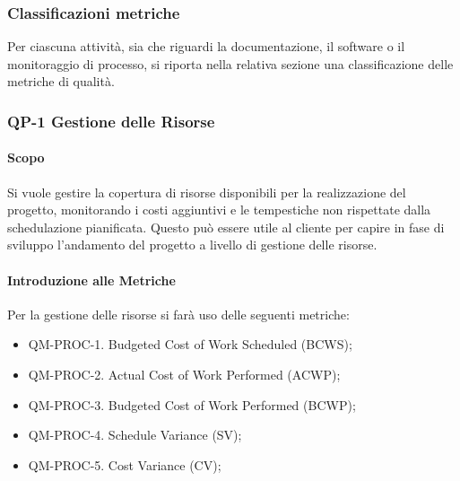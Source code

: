 



	\subsubsection{Classificazioni metriche} %

	Per ciascuna attività, sia che riguardi la documentazione, il software o il monitoraggio di processo, si riporta nella relativa sezione una classificazione delle metriche di qualità.

	\subsubsection{QP-1 Gestione delle Risorse}

		\paragraph{Scopo}

		Si vuole gestire la copertura di risorse disponibili per la realizzazione del progetto, monitorando i costi aggiuntivi e le tempestiche non rispettate dalla schedulazione pianificata. Questo può essere utile al cliente per capire in fase di sviluppo l'andamento del progetto a livello di gestione delle risorse.

		\paragraph{Introduzione alle Metriche}

		Per la gestione delle risorse si farà uso delle seguenti metriche:

		\begin{itemize}
			\item QM-PROC-1. Budgeted Cost of Work Scheduled (BCWS);
			\item QM-PROC-2. Actual Cost of Work Performed (ACWP);
			\item QM-PROC-3. Budgeted Cost of Work Performed (BCWP);
			\item QM-PROC-4. Schedule Variance (SV);
			\item QM-PROC-5. Cost Variance (CV);
		\end{itemize}

